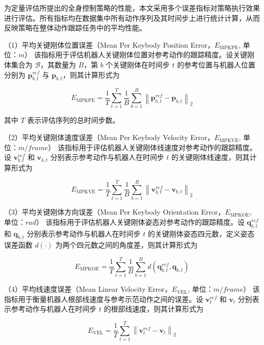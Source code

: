 为定量评估所提出的全身控制策略的性能，本文采用多个误差指标对策略执行效果进行评估。所有指标均在数据集中所有动作序列及其时间步上进行统计计算，从而反映策略在整体动作跟踪任务中的平均性能。

（1）平均关键刚体位置误差（Mean Per Keybody Position Error，$E_{\mathrm{MPKPE}}$, 单位：$m$）  
该指标用于评估机器人关键刚体位置对参考动作的跟踪精度。设关键刚体集合为 $\mathcal{B}$，其数量为 $B$，第 $b$ 个关键刚体在时间步 $t$ 的参考位置与机器人位置分别为 $\mathbf{p}^{ref}_{b,t}$ 与 $\mathbf{p}_{b,t}$，则其计算形式为

\begin{equation}
	E_{\mathrm{MPKPE}} =
	\frac{1}{T}
	\sum_{t=1}^{T}
	\frac{1}{B}
	\sum_{b=1}^{B}
	\left\|
	\mathbf{p}^{ref}_{b,t}
	-
	\mathbf{p}_{b,t}
	\right\|_2 
\end{equation}

其中 $T$ 表示评估序列的总时间步数。

（2）平均关键刚体速度误差（Mean Per Keybody Velocity Error，$E_{\mathrm{MPKVE}}$, 单位：$m/frame$）  
该指标用于评估机器人关键刚体线速度对参考动作的跟踪精度。设 $\mathbf{v}^{ref}_{b,t}$ 和 $\mathbf{v}_{b,t}$ 分别表示参考动作与机器人在时间步 $t$ 的关键刚体线速度，则其计算形式为

\begin{equation}
	E_{\mathrm{MPKVE}} =
	\frac{1}{T}
	\sum_{t=1}^{T}
	\frac{1}{B}
	\sum_{b=1}^{B}
	\left\|
	\mathbf{v}^{ref}_{b,t}
	-
	\mathbf{v}_{b,t}
	\right\|_2 
\end{equation}

（3）平均关键刚体方向误差（Mean Per Keybody Orientation Error，$E_{\mathrm{MPKOE}}$, 单位：$rad$）  
该指标用于评估机器人关键刚体姿态对参考动作的跟踪精度。设 $\mathbf{q}^{ref}_{b,t}$ 和 $\mathbf{q}_{b,t}$ 分别表示参考动作与机器人在时间步 $t$ 的关键刚体姿态四元数，定义姿态误差函数 $d(\cdot)$ 为两个四元数之间的角度差，则其计算形式为

\begin{equation}
	E_{\mathrm{MPKOE}} =
	\frac{1}{T}
	\sum_{t=1}^{T}
	\frac{1}{B}
	\sum_{b=1}^{B}
	d\!\left(
	\mathbf{q}^{ref}_{b,t},
	\mathbf{q}_{b,t}
	\right)
\end{equation}

（4）平均线速度误差（Mean Linear Velocity Error，$E_{\mathrm{VEL}}$, 单位：$m/frame	$）  
该指标用于衡量机器人根部线速度与参考示范动作之间的误差。设 $\mathbf{v}^{ref}_{t}$ 和 $\mathbf{v}_{t}$ 分别表示参考动作与机器人在时间步 $t$ 的根部线速度，则其计算形式为

\begin{equation}
	E_{\mathrm{VEL}} =
	\frac{1}{T}
	\sum_{t=1}^{T}
	\left\|
	\mathbf{v}^{ref}_{t}
	-
	\mathbf{v}_{t}
	\right\|_2 
\end{equation}

